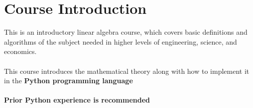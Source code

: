 \section{Course Introduction}
This is an introductory linear algebra course, which covers basic definitions and algorithms of the subject needed in higher levels of engineering, science, and economics. \\\\
This course introduces the mathematical theory along with how to implement it in the \textbf{Python programming language} \\\\
\textbf{Prior Python experience is recommended}

